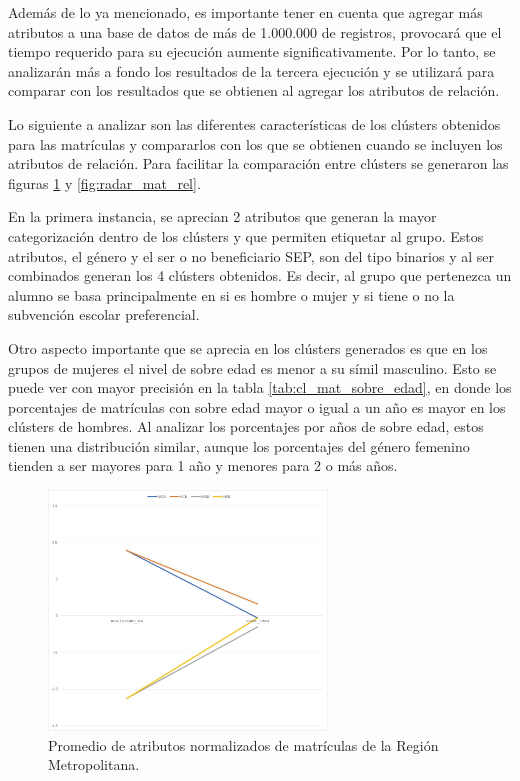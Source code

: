 Además de lo ya mencionado, es importante tener en cuenta que agregar más atributos a una base de datos de más de 1.000.000 de registros, provocará que el tiempo requerido para su ejecución aumente significativamente. Por lo tanto, se analizarán más a fondo los resultados de la tercera ejecución y se utilizará para comparar con los resultados que se obtienen al agregar los atributos de relación.

Lo siguiente a analizar son las diferentes características de los clústers obtenidos para las matrículas y compararlos con los que se obtienen cuando se incluyen los atributos de relación. Para facilitar la comparación entre clústers se generaron las figuras \ref{fig:chart_mat} y \ref{fig:radar_mat_rel}.

En la primera instancia, se aprecian 2 atributos que generan la mayor categorización dentro de los clústers y que permiten etiquetar al grupo. Estos atributos, el género y el ser o no beneficiario SEP, son del tipo binarios y al ser combinados generan los 4 clústers obtenidos. Es decir, al grupo que pertenezca un alumno se basa principalmente en si es hombre o mujer y si tiene o no la subvención escolar preferencial.

Otro aspecto importante que se aprecia en los clústers generados es que en los grupos de mujeres el nivel de sobre edad es menor a su símil masculino. Esto se puede ver con mayor precisión en la tabla \ref{tab:cl_mat_sobre_edad}, en donde los porcentajes de matrículas con sobre edad mayor o igual a un año es mayor en los clústers de hombres. Al analizar los porcentajes por años de sobre edad, estos tienen una distribución similar, aunque los porcentajes del género femenino tienden a ser mayores para 1 año y menores para 2 o más años.

\begin{figure}[hc]
    \centering
    \includegraphics[width=0.66\textwidth]{images/chart_matriculas_sin.jpg}
    \caption{Promedio de atributos normalizados de matrículas de la Región Metropolitana.}
    \label{fig:chart_mat}
\end{figure}

